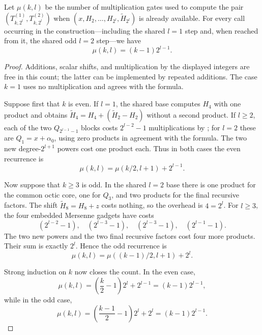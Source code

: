 \begin{lemma}\label{lem:T-multiplication-count}
    Let $\mu(k,l)$ be the number of multiplication gates used to compute the
    pair $(T^{(1)}_{k,2^l},T^{(2)}_{k,2^l})$ when
    $(x,H_2,\ldots,H_{2^l},\tilde H_{2^l})$ is already available.  For every
    call occurring in the construction---including the shared $l=1$ step and,
    when reached from it, the shared odd $l=2$ step---we have
    \[
       \mu(k,l)=(k-1)2^{l-1}.
    \]
\end{lemma}
\begin{proof}
    Additions, scalar shifts, and multiplication by the displayed integers are
    free in this count; the latter can be implemented by repeated additions.
    The case $k=1$ uses no multiplication and agrees with the formula.

    Suppose first that $k$ is even.  If $l=1$, the shared base computes $H_4$
    with one product and obtains $\tilde H_4=H_4+(\tilde H_2-H_2)$ without a
    second product.  If $l\ge2$, each of the two
    $Q_{2^{l-1}-1}$ blocks costs $2^{l-2}-1$ multiplications by
    ; for $l=2$ these are $Q_1=x+\alpha_0$,
    using zero products in agreement with the formula.  The two new
    degree-$2^{l+1}$ powers cost one product each.  Thus in both cases the even recurrence is
    \[
       \mu(k,l)=\mu(k/2,l+1)+2^{l-1}.
    \]

    Now suppose that $k\ge3$ is odd.  In the shared $l=2$ base there is one
    product for the common octic core, one for $Q_3$, and two products for the
    final recursive factors.  The shift $\tilde H_8=H_8+z$ costs
    nothing, so the overhead is $4=2^l$.  For $l\ge3$, the four embedded
    Mersenne gadgets have costs
    \[
       (2^{l-2}-1),\quad (2^{l-3}-1),\quad
       (2^{l-3}-1),\quad (2^{l-1}-1).
    \]
    The two new powers and the two final recursive factors cost four more
    products.  Their sum is exactly $2^l$.  Hence the odd recurrence is
    \[
       \mu(k,l)=\mu((k-1)/2,l+1)+2^l.
    \]

    Strong induction on $k$ now closes the count.  In the even case,
    \[
      \mu(k,l)=\left(\frac{k}{2}-1\right)2^l+2^{l-1}
               =(k-1)2^{l-1},
    \]
    while in the odd case,
    \[
      \mu(k,l)=\left(\frac{k-1}{2}-1\right)2^l+2^l
               =(k-1)2^{l-1}.
    \]
\end{proof}


